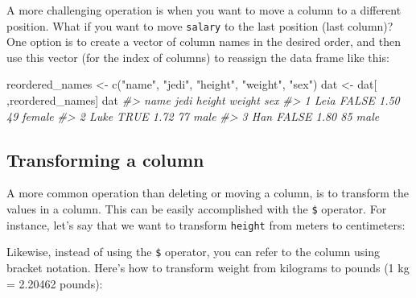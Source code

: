 \documentclass[
]{book}
\newenvironment{Shaded}{\begin{snugshade}}{\end{snugshade}}
\newcommand{\CommentTok}[1]{\textcolor[rgb]{0.56,0.35,0.01}{\textit{#1}}}
\newcommand{\DecValTok}[1]{\textcolor[rgb]{0.00,0.00,0.81}{#1}}
\newcommand{\FunctionTok}[1]{\textcolor[rgb]{0.00,0.00,0.00}{#1}}
\newcommand{\NormalTok}[1]{#1}
\newcommand{\OtherTok}[1]{\textcolor[rgb]{0.56,0.35,0.01}{#1}}
\newcommand{\SpecialCharTok}[1]{\textcolor[rgb]{0.00,0.00,0.00}{#1}}
\newcommand{\StringTok}[1]{\textcolor[rgb]{0.31,0.60,0.02}{#1}}
\begin{document}
A more challenging operation is when you want to move a column to a different
position. What if you want to move \texttt{salary} to the last position (last column)?
One option is to create a vector of column names in the desired order, and then
use this vector (for the index of columns) to reassign the data frame like this:

\begin{Shaded}
\begin{Highlighting}[]
\NormalTok{reordered\_names }\OtherTok{\textless{}{-}} \FunctionTok{c}\NormalTok{(}\StringTok{"name"}\NormalTok{, }\StringTok{"jedi"}\NormalTok{, }\StringTok{"height"}\NormalTok{, }\StringTok{"weight"}\NormalTok{, }\StringTok{"sex"}\NormalTok{)}
\NormalTok{dat }\OtherTok{\textless{}{-}}\NormalTok{ dat[ ,reordered\_names]}
\NormalTok{dat}
\CommentTok{\#\textgreater{}   name  jedi height weight    sex}
\CommentTok{\#\textgreater{} 1 Leia FALSE   1.50     49 female}
\CommentTok{\#\textgreater{} 2 Luke  TRUE   1.72     77   male}
\CommentTok{\#\textgreater{} 3  Han FALSE   1.80     85   male}
\end{Highlighting}
\end{Shaded}

\hypertarget{transforming-a-column}{%
\subsection{Transforming a column}\label{transforming-a-column}}

A more common operation than deleting or moving a column, is to transform the
values in a column. This can be easily accomplished with the \texttt{\$} operator.
For instance, let's say that we want to transform \texttt{height} from meters to
centimeters:

\begin{Shaded}
\end{Shaded}

Likewise, instead of using the \texttt{\$} operator, you can refer to the column using
bracket notation. Here's how to transform weight from kilograms to pounds
(1 kg = 2.20462 pounds):
\end{document}
